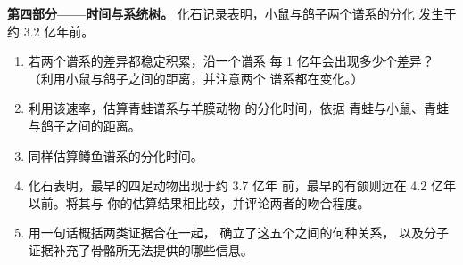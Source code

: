 \begin{problem}
\medskip
\noindent\textbf{第四部分——时间与系统树。}
化石记录表明，小鼠与鸽子两个谱系的分化
发生于约 3.2 亿年前。
\begin{enumerate}[resume]
  \item 若两个谱系的差异都稳定积累，沿一个谱系
        每 1 亿年会出现多少个差异？
        （利用小鼠与鸽子之间的距离，并注意两个
        谱系都在变化。）
  \item 利用该速率，估算青蛙谱系与羊膜动物
        的分化时间，依据
        青蛙与小鼠、青蛙与鸽子之间的距离。
  \item 同样估算鳟鱼谱系的分化时间。
  \item 化石表明，最早的四足动物出现于约 3.7 亿年
        前，最早的有颌则远在 4.2 亿年以前。将其与
        你的估算结果相比较，并评论两者的吻合程度。
  \item 用一句话概括两类证据合在一起，
        确立了这五个之间的何种关系，
        以及分子证据补充了骨骼所无法提供的哪些信息。
\end{enumerate}
\end{problem}

